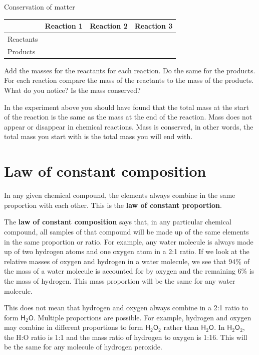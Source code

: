 \begin{i_experiment}{Conservation of matter}
\begin{table}[H]
\begin{center}
      \label{m38711*eip-581}
      \begin{tabular}{|l|l|l|l|}\hline
         &
        Reaction 1 &
        Reaction 2 &
        Reaction 3 \\ \hline
        Reactants &
         &
         &
        \\ \hline
        Products &
         &
         &
        \\ \hline
    \end{tabular}
      \end{center}
\end{table}
    \par
  \label{m38711*eip-634}Add the masses for the reactants for each reaction. Do the same for the products. For each reaction compare the mass of the reactants to the mass of the products. What do you notice? Is the mass conserved?\par \label{m38711*eip-65}In the experiment above you should have found that the total mass at the start of the reaction is the same as the mass at the end of the reaction. Mass does not appear or disappear in chemical reactions. Mass is conserved, in other words, the total mass you start with is the total mass you will end with.  \par
\end{i_experiment} 
    \label{m38711*cid6}
            \section{Law of constant composition}
            \nopagebreak
      \label{m38711*id65065}In any given chemical compound, the elements always combine in the same proportion with each other. This is the \textbf{law of constant proportion}.\par 
      \label{m38711*id65075}The \textbf{law of constant composition} says that, in any particular chemical compound, all samples of that compound will be made up of the same elements in the same proportion or ratio. For example, any water molecule is always made up of two hydrogen atoms and one oxygen atom in a 2:1 ratio. If we look at the relative masses of oxygen and hydrogen in a water molecule, we see that 94\% of the mass of a water molecule is accounted for by oxygen and the remaining 6\% is the mass of hydrogen. This mass proportion will be the same for any water molecule.\par 
      \label{m38711*id65089}This does not mean that hydrogen and oxygen always combine in a 2:1 ratio to form $\mathsf{H}{}_{2}\mathsf{O}$. Multiple proportions are possible. For example, hydrogen and oxygen may combine in different proportions to form $\mathsf{H}{}_{2}\mathsf{O}{}_{2}$ rather than $\mathsf{H}{}_{2}\mathsf{O}$. In $\mathsf{H}{}_{2}\mathsf{O}{}_{2}$, the H:O ratio is 1:1 and the mass ratio of hydrogen to oxygen is 1:16. This will be the same for any molecule of hydrogen peroxide.\par 
    \label{m38711*cid7}

